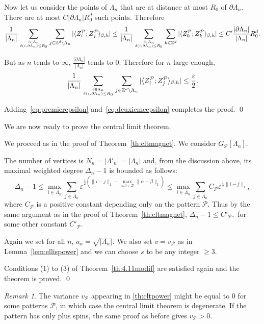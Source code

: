 \documentclass{amsart}
\newcommand{\field}[1]{\mathbb{#1}}
\newcommand{\Z}{\field{Z}}
\def\WDep{G}
\def\eps{\varepsilon}
\newcommand{\dist}[2]{\|#1 - #2\|_1}
\numberwithin{equation}{section}
\theoremstyle{remark}
\newtheorem{remark}[theorem]{Remark}
\renewenvironment{proof}[1][Proof]{\begin{trivlist}
\item[\hskip \labelsep {\bfseries #1:}]}{\qed\end{trivlist}}
\begin{document}
\begin{proof}
Now let us consider the points of $\Lambda_n$ that are at distance at most $R_0$ of $\partial \Lambda_n$. There are at most $C |\partial \Lambda_n| R_0^d$ such points. Therefore
\[
\frac{1}{|\Lambda_n|} \sum_{i \in \Lambda_n \atop \delta(i, \partial \Lambda_n)\leq R_0} \sum_{j \in \Z^d \setminus \Lambda_n} |\langle Z_i^{\mathcal{P}} ; Z_j^{\mathcal{P}} \rangle_{\beta,h}| \leq \frac{1}{|\Lambda_n|} \sum_{i \in \Lambda_n \atop \delta(i, \partial \Lambda_n)\leq R_0} \sum_{k \in \Z^d} |\langle Z_0^{\mathcal{P}} ; Z_k^{\mathcal{P}} \rangle_{\beta,h}|
\leq C' \frac{|\partial \Lambda_n|}{|\Lambda_n|} R_0^d.
\]

But as $n$ tends to $\infty$, $\frac{|\partial \Lambda_n|}{|\Lambda_n|}$ tends to $0$. Therefore for $n$ large enough,
\begin{equation}
\label{eq:deuxiemeepsilon}
\frac{1}{|\Lambda_n|} \sum_{i \in \Lambda_n \atop \delta(i, \partial \Lambda_n)\leq R_0} \sum_{j \in \Z^d \setminus \Lambda_n} |\langle Z_i^{\mathcal{P}} ; Z_j^{\mathcal{P}} \rangle_{\beta,h}| \leq \frac{\eps}{2}.
\end{equation}

Adding~\eqref{eq:premierepsilon} and~\eqref{eq:deuxiemeepsilon} completes the proof.
\end{proof} 
 
We are now ready to prove the central limit theorem.





\begin{proof}[Proof of \cref{th:cltpower}]
We proceed as in the proof of Theorem~\ref{th:cltmagnet}.
We consider $\WDep_{\mathcal{P}}[\Lambda_n]$.

The number of vertices is $N_n = |\Lambda'_n| = |\Lambda_n|$ and,
from the discussion above, its maximal weighted degree $\Delta_n-1$ is bounded as follows:
\[
  \Delta_n -1 \le \max_{i \in \Lambda_n} \sum_{j \in \Lambda_n} \eps^{\tfrac{1}{2} \left(\dist{i}{j} - \max_{\alpha,\beta \in \mathcal{D}} \dist{\alpha}{\beta}\right)}
   \leq \max_{i \in \Lambda_n} \sum_{j \in \Lambda_n} C_{\mathcal{P}}\eps^{\tfrac{1}{2} \dist{i}{j}},
   \]
where $C_{\mathcal{P}}$ is a positive constant depending only on the pattern $\mathcal{P}.$
Thus by the same argument as in the proof of Theorem~\ref{th:cltmagnet},
$
\Delta_n -1 \leq C'_{\mathcal{P}},
$
for some other constant $C'_{\mathcal{P}}$.


Again we set for all $n$, $a_n= \sqrt{|\Lambda_n|}.$ We also set $v = v_{\mathcal{P}}$ as in Lemma~\ref{lem:ellispower} and we can choose $s$ to be any integer $\geq 3$.

Conditions (1) to (3) of Theorem~\ref{th:4.11modif} are satisfied again and the theorem is proved.
\end{proof}
\begin{remark}
  The variance $v_{\mathcal{P}}$ appearing in \cref{th:cltpower}
  might be equal to $0$ for some patterns $\mathcal{P}$,
in which case the central limit theorem is degenerate.
If the pattern has only plus spins,
the same proof as before gives $v_{\mathcal{P}}>0$.
\end{remark}
\end{document}
